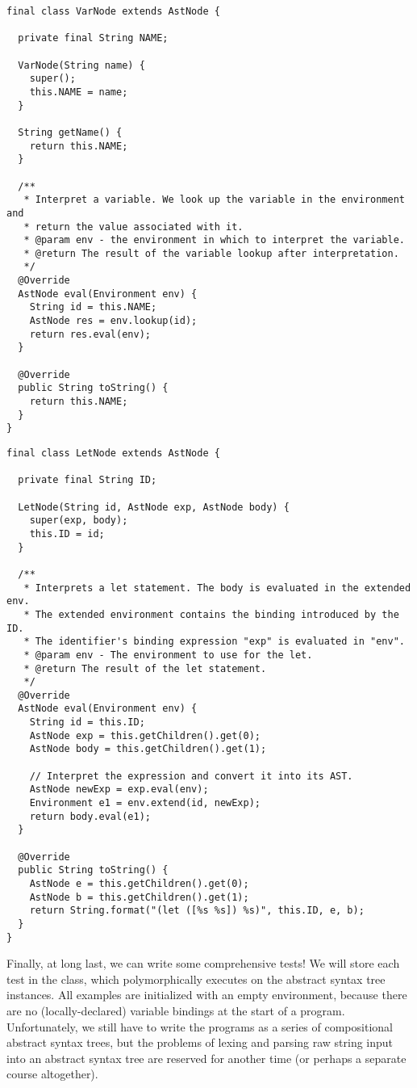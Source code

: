\enlargethispage{-6\baselineskip}
\begin{lstlisting}[language=MyJava]
final class VarNode extends AstNode {

  private final String NAME;

  VarNode(String name) {
    super();
    this.NAME = name;
  }

  String getName() {
    return this.NAME;
  }

  /**
   * Interpret a variable. We look up the variable in the environment and
   * return the value associated with it.
   * @param env - the environment in which to interpret the variable.
   * @return The result of the variable lookup after interpretation.
   */
  @Override
  AstNode eval(Environment env) {
    String id = this.NAME;
    AstNode res = env.lookup(id);
    return res.eval(env);
  }

  @Override
  public String toString() { 
    return this.NAME; 
  }
}
\end{lstlisting}
  
\begin{lstlisting}[language=MyJava]
final class LetNode extends AstNode {

  private final String ID;

  LetNode(String id, AstNode exp, AstNode body) {
    super(exp, body);
    this.ID = id;
  }

  /**
   * Interprets a let statement. The body is evaluated in the extended env.
   * The extended environment contains the binding introduced by the ID.
   * The identifier's binding expression "exp" is evaluated in "env".
   * @param env - The environment to use for the let.
   * @return The result of the let statement.
   */
  @Override
  AstNode eval(Environment env) {
    String id = this.ID;
    AstNode exp = this.getChildren().get(0);
    AstNode body = this.getChildren().get(1);

    // Interpret the expression and convert it into its AST.
    AstNode newExp = exp.eval(env);
    Environment e1 = env.extend(id, newExp);
    return body.eval(e1);
  }

  @Override
  public String toString() {
    AstNode e = this.getChildren().get(0);
    AstNode b = this.getChildren().get(1);
    return String.format("(let ([%s %s]) %s)", this.ID, e, b);
  }
}
\end{lstlisting}

Finally, at long last, we can write some comprehensive tests! 
We will store each test in the  class, which polymorphically executes  on the abstract syntax tree instances. 
All examples are initialized with an empty environment, because there are no (locally-declared) variable bindings at the start of a program. 
Unfortunately, we still have to write the programs as a series of compositional abstract syntax trees, but the problems of lexing and parsing raw string input into an abstract syntax tree are reserved for another time (or perhaps a separate course altogether). 

